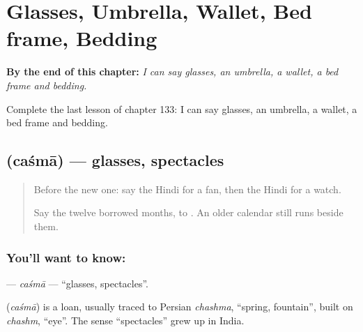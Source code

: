 
\chapter{Glasses, Umbrella, Wallet, Bed frame, Bedding}
\label{ch:hi-glasses-umbrella-wallet-bed-frame-bedding}

\begin{chapteropening}
\textbf{By the end of this chapter:} \emph{I can say glasses, an umbrella, a wallet, a bed frame and bedding.}

Complete the last lesson of chapter 133: I can say glasses, an umbrella, a wallet, a bed frame and bedding.
\end{chapteropening}

\section[\texorpdfstring{\hi{चश्मा} (caśmā)}{चश्मा (caśmā)}]{ (caśmā) — glasses, spectacles}

\label{lesson:HI-C133-casma}



\begin{quote}
Before the new one: say the Hindi for a fan, then the Hindi for a watch.

Say the twelve borrowed months, \textbf{} to \textbf{}. An older calendar still runs beside them.
\end{quote}

\subsection*{You'll want to know: }
\textbf{} — \emph{caśmā} — \textquotedblleft{}glasses, spectacles\textquotedblright{}.

\begin{cousinweb}
\textbf{} (\emph{caśmā}) is a loan, usually traced to Persian \emph{chashma}, \textquotedblleft{}spring, fountain\textquotedblright{}, built on \emph{chashm}, \textquotedblleft{}eye\textquotedblright{}. The sense \textquotedblleft{}spectacles\textquotedblright{} grew up in India.
\end{cousinweb}

